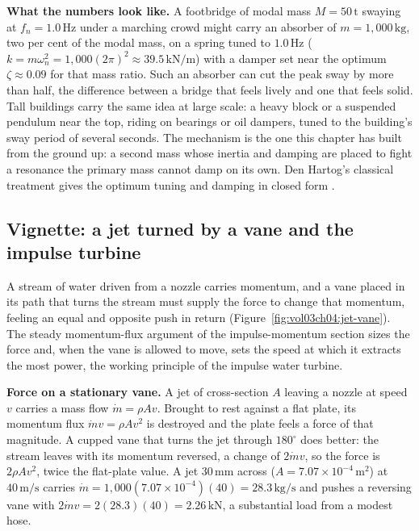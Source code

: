 \textbf{What the numbers look like.} A footbridge of modal mass
$M=50\,\si{\tonne}$ swaying at $f_{n}=1.0\,\si{\hertz}$ under a marching
crowd might carry an absorber of $m=1{,}000\,\si{\kilogram}$, two per
cent of the modal mass, on a spring tuned to $1.0\,\si{\hertz}$
($k=m\omega_{n}^{2}=1{,}000(2\pi)^{2}\approx 39.5\,\si{\kilo\newton\per
\meter}$) with a damper set near the optimum $\zeta\approx 0.09$ for that
mass ratio. Such an absorber can cut the peak sway by more than half, the
difference between a bridge that feels lively and one that feels solid.
Tall buildings carry the same idea at large scale: a heavy block or a
suspended pendulum near the top, riding on bearings or oil dampers,
tuned to the building's sway period of several seconds. The mechanism is
the one this chapter has built from the ground up: a second mass whose
inertia and damping are placed to fight a resonance the primary mass
cannot damp on its own. Den Hartog's classical treatment gives the
optimum tuning and damping in closed form
\cite{text:den-hartog-vibrations}.



\subsection{Vignette: a jet turned by a vane and the impulse turbine}

 A stream of water driven from a nozzle carries
momentum, and a vane placed in its path that turns the stream must
supply the force to change that momentum, feeling an equal and opposite
push in return (Figure~\ref{fig:vol03ch04:jet-vane}). The steady
momentum-flux argument of the impulse-momentum section sizes the force
and, when the vane is allowed to move, sets the speed at which it
extracts the most power, the working principle of the impulse water
turbine.

\textbf{Force on a stationary vane.} A jet of cross-section $A$ leaving a
nozzle at speed $v$ carries a mass flow $\dot{m}=\rho A v$. Brought to
rest against a flat plate, its momentum flux $\dot{m}v=\rho A v^{2}$ is
destroyed and the plate feels a force of that magnitude. A cupped vane
that turns the jet through $180^{\circ}$ does better: the stream leaves
with its momentum reversed, a change of $2\dot{m}v$, so the force is
$2\rho A v^{2}$, twice the flat-plate value. A jet $30\,\si{\milli
\meter}$ across ($A=7.07\times 10^{-4}\,\si{\meter\squared}$) at
$40\,\si{\meter\per\second}$ carries $\dot{m}=1{,}000(7.07\times
10^{-4})(40)=28.3\,\si{\kilogram\per\second}$ and pushes a reversing
vane with $2\dot{m}v=2(28.3)(40)=2.26\,\si{\kilo\newton}$, a substantial
load from a modest hose.

